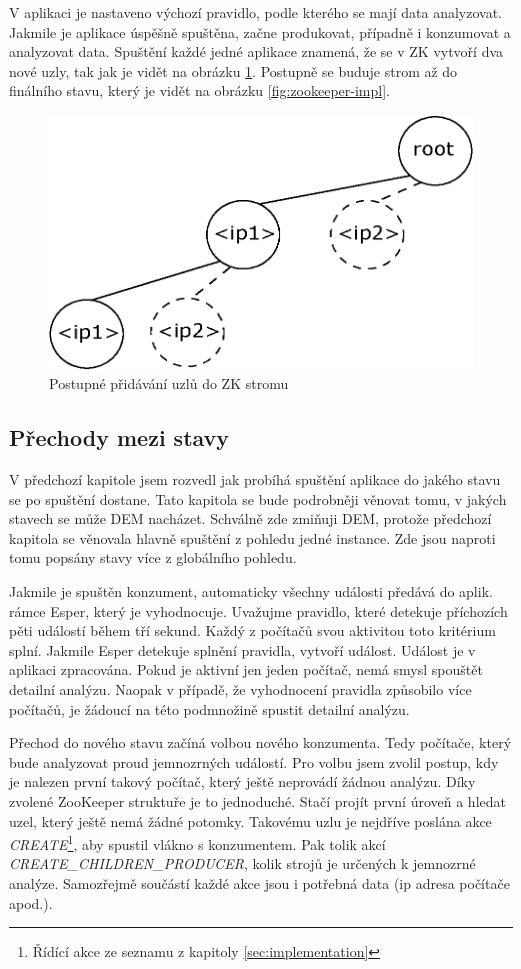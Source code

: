 \documentclass[
  digital, %
  table,   %
  nolof,     %
  nolot,     %
  oneside, %
  nocover,
  monochrome,
  12pt
]{fithesis3}
\begin{document}
V aplikaci je nastaveno výchozí pravidlo, podle kterého se mají data analyzovat. Jakmile je aplikace úspěšně spuštěna, začne produkovat, případně i konzumovat a analyzovat data. Spuštění každé jedné aplikace znamená, že se v ZK vytvoří dva nové uzly, tak jak je vidět na obrázku  \ref{fig:app-start}. Postupně se buduje strom až do finálního stavu, který je vidět na obrázku \ref{fig:zookeeper-impl}.

\begin{figure}[H]
	\centering
    \includegraphics[width=.4\linewidth, height=.18\textheight]{images/app-start.eps}
    \caption{Postupné přidávání uzlů do ZK stromu}
    \label{fig:app-start}
\end{figure}

\subsection{Přechody mezi stavy}
V předchozí kapitole jsem rozvedl jak probíhá spuštění aplikace do jakého stavu se po spuštění dostane. Tato kapitola se bude podrobněji věnovat tomu, v jakých stavech se může DEM nacházet. Schválně zde zmiňuji DEM, protože předchozí kapitola se věnovala hlavně spuštění z pohledu jedné instance. Zde jsou naproti tomu popsány stavy více z globálního pohledu.

Jakmile je spuštěn konzument, automaticky všechny události předává do aplik. rámce Esper, který je vyhodnocuje. Uvažujme pravidlo, které detekuje příchozích pěti událostí během tří sekund. Každý z počítačů svou aktivitou toto kritérium splní. Jakmile Esper detekuje splnění pravidla, vytvoří událost. Událost je v aplikaci zpracována. Pokud je aktivní jen jeden počítač, nemá smysl spouštět detailní analýzu. Naopak v případě, že vyhodnocení pravidla způsobilo více počítačů, je žádoucí na této podmnožině spustit detailní analýzu.

Přechod do nového stavu začíná volbou nového konzumenta. Tedy počítače, který bude analyzovat proud jemnozrných událostí. Pro volbu jsem zvolil postup, kdy je nalezen první takový počítač, který ještě neprovádí žádnou analýzu. Díky zvolené ZooKeeper struktuře je to jednoduché. Stačí projít první úroveň a hledat uzel, který ještě nemá žádné potomky. Takovému uzlu je nejdříve poslána akce \textit{CREATE}\footnote{Řídící akce ze seznamu z kapitoly \ref{sec:implementation}}, aby spustil vlákno s konzumentem. Pak tolik akcí \\ \textit{CREATE\_CHILDREN\_PRODUCER}, kolik strojů je určených k jemnozrné analýze. Samozřejmě součástí každé akce jsou i potřebná data (ip adresa počítače apod.).
\end{document}
